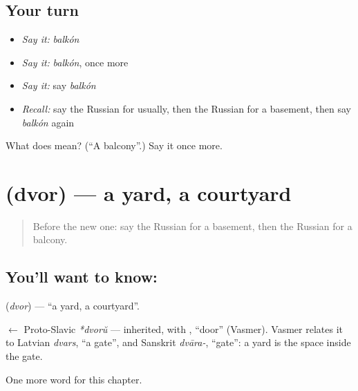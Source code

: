 \subsection*{Your turn}
\begin{itemize}
\raggedright
  \item \emph{Say it:} \emph{balkón}
  \item \emph{Say it:} \emph{balkón}, once more
  \item \emph{Say it:} say \emph{balkón}
  \item \emph{Recall:} say the Russian for usually, then the Russian for a basement, then say \emph{balkón} again
\end{itemize}

\begin{tcolorbox}[breakable,colback=teal!4,colframe=teal!35!black,title={Before you move on}]
What does  mean? (\textquotedblleft{}A balcony\textquotedblright{}.) Say it once more.
\end{tcolorbox}
\section[\texorpdfstring{\ru{двор} (dvor)}{двор (dvor)}]{ (dvor) — a yard, a courtyard}

\label{lesson:RU-C241-dvor}



\begin{quote}
Before the new one: say the Russian for a basement, then the Russian for a balcony.
\end{quote}

\subsection*{You'll want to know: }
\textbf{} (\emph{dvor}) — \textquotedblleft{}a yard, a courtyard\textquotedblright{}.

\begin{cousinweb}
\textbf{} $\leftarrow$ Proto-Slavic \emph{*dvorŭ} — inherited, with \emph{}, \textquotedblleft{}door\textquotedblright{} (Vasmer). Vasmer relates it to Latvian \emph{dvars}, \textquotedblleft{}a gate\textquotedblright{}, and Sanskrit \emph{dvāra-}, \textquotedblleft{}gate\textquotedblright{}: a yard is the space inside the gate.
\end{cousinweb}

\begin{grammarlens}[title={What you've built}]
One more word for this chapter.
\end{grammarlens}

